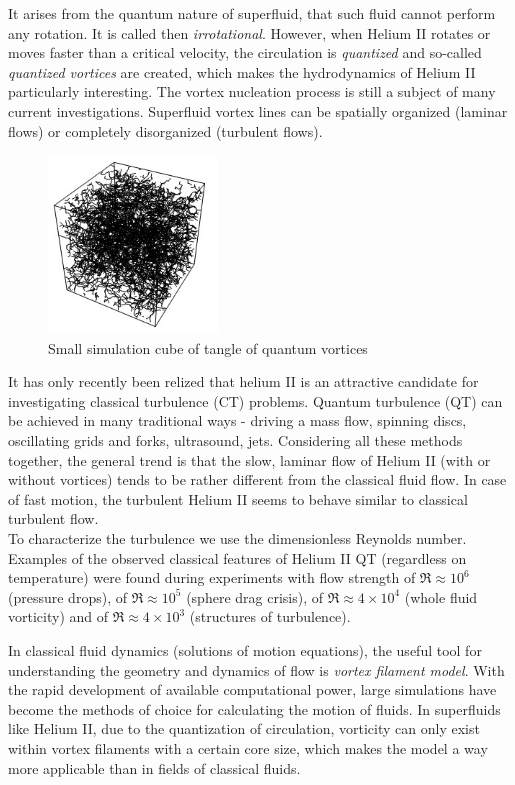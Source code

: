 	It arises from the quantum nature of superfluid, that such fluid cannot perform any rotation. It is called then \textit{irrotational}. However, when Helium II rotates or moves faster than a critical velocity, the circulation is \textit{quantized} and so-called \textit{quantized vortices} are created, which makes the hydrodynamics of Helium II particularly interesting. The vortex nucleation process is still a subject of many current investigations. Superfluid vortex lines can be spatially organized (laminar flows) or completely disorganized (turbulent flows).

	\begin{figure}[h]
		\centering
		\includegraphics[width=0.4\textwidth]{graphics/theory/QT-tangle}
		\caption{Small simulation cube of tangle of quantum vortices}
		\label{QT}
	\end{figure}

	It has only recently been relized that helium II is an attractive candidate for investigating classical turbulence (CT) problems. Quantum turbulence (QT) can be achieved in many traditional ways - driving a mass flow, spinning discs, oscillating grids and forks, ultrasound, jets. Considering all these methods together, the general trend is that the slow, laminar flow of Helium II (with or without vortices) tends to be rather different from the classical fluid flow. In case of fast motion, the turbulent Helium II seems to behave similar to classical turbulent flow.\\
	To characterize the turbulence we use the dimensionless Reynolds number. Examples of the observed classical features of Helium II QT (regardless on temperature) were found during experiments with flow strength of $\Re \approx 10^6$ (pressure drops), of $\Re \approx 10^5$ (sphere drag crisis), of $\Re \approx 4 \times 10^4$ (whole fluid vorticity) and of $\Re \approx 4 \times 10^3$ (structures of turbulence).

	In classical fluid dynamics (solutions of motion equations), the useful tool for understanding the geometry and dynamics of flow is \textit{vortex filament model}. With the rapid development of available computational power, large simulations have become the methods of choice for calculating the motion of fluids. In superfluids like Helium II, due to the quantization of circulation, vorticity can only exist within vortex filaments with a certain core size, which makes the model a way more applicable than in fields of classical fluids.


